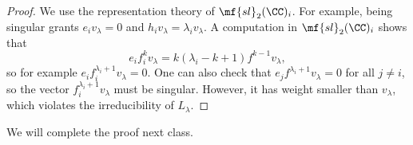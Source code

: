 \documentclass[../notes.tex]{subfiles}
\begin{document}
\begin{proof}
	We use the representation theory of $\mf{sl}_2(\CC)_i$. For example, being singular grants $e_iv_\lambda=0$ and $h_iv_\lambda=\lambda_iv_\lambda$. A computation in $\mf{sl}_2(\CC)_i$ shows that
	\[e_if_i^kv_\lambda=k(\lambda_i-k+1)f^{k-1}v_\lambda,\]
	so for example $e_if_i^{\lambda_i+1}v_\lambda=0$. One can also check that $e_jf^{\lambda_i+1}v_\lambda=0$ for all $j\ne i$, so the vector $f_i^{\lambda_i+1}v_\lambda$ must be singular. However, it has weight smaller than $v_\lambda$, which violates the irreducibility of $L_\lambda$.
\end{proof}
We will complete the proof next class.
\end{document}
